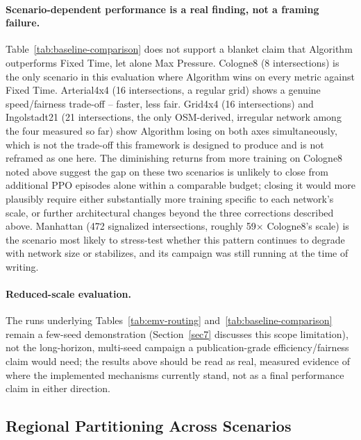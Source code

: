 \documentclass[3p,times]{elsarticle}
\theoremstyle{plain}
\theoremstyle{definition}
\begin{document}
\paragraph{Scenario-dependent performance is a real finding, not a
framing failure.} Table~\ref{tab:baseline-comparison} does not support
a blanket claim that Algorithm outperforms Fixed Time, let alone Max
Pressure. Cologne8 (8 intersections) is the only scenario in this
evaluation where Algorithm wins on every metric against Fixed Time.
Arterial4x4 (16 intersections, a regular grid) shows a genuine
speed/fairness trade-off -- faster, less fair. Grid4x4 (16
intersections) and Ingolstadt21 (21 intersections, the only
OSM-derived, irregular network among the four measured so far) show
Algorithm losing on both axes simultaneously, which is not the
trade-off this framework is designed to produce and is not reframed
as one here. The diminishing returns from more training on Cologne8
noted above suggest the gap on these two scenarios is unlikely to
close from additional PPO episodes alone within a comparable budget;
closing it would more plausibly require either substantially more
training specific to each network's scale, or further architectural
changes beyond the three corrections described above. Manhattan (472
signalized intersections, roughly 59$\times$ Cologne8's scale) is the
scenario most likely to stress-test whether this pattern continues to
degrade with network size or stabilizes, and its campaign was still
running at the time of writing.

\paragraph{Reduced-scale evaluation.} The runs underlying
Tables~\ref{tab:emv-routing} and~\ref{tab:baseline-comparison} remain
a few-seed demonstration (Section~\ref{sec7} discusses this scope
limitation), not the long-horizon, multi-seed campaign a
publication-grade efficiency/fairness claim would need; the results
above should be read as real, measured evidence of where the
implemented mechanisms currently stand, not as a final performance
claim in either direction.

\subsection{Regional Partitioning Across Scenarios}\label{subsec6-4}
\end{document}
